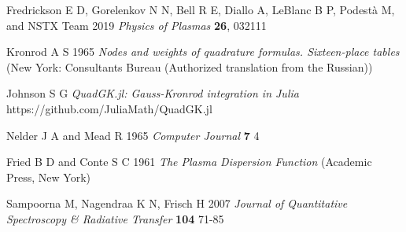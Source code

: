 \documentclass[12pt]{iopart}
\begin{document}
\begin{thebibliography}{9}
Fredrickson E D, Gorelenkov  N N, Bell R E, Diallo A, LeBlanc B P, Podestà  M, and NSTX Team 2019 \textit{Physics of Plasmas} \textbf{26}, 032111

Kronrod A S 1965 \textit{Nodes and weights of quadrature formulas. Sixteen-place tables} (New York: Consultants Bureau (Authorized translation from the Russian))

Johnson S G \textit{QuadGK.jl: Gauss-Kronrod integration in Julia} https://github.com/JuliaMath/QuadGK.jl

Nelder J A and Mead R 1965 \textit{Computer Journal} \textbf{7} 4


Fried B D and Conte S C 1961 \textit{The Plasma Dispersion Function} (Academic Press, New York)

Sampoorna M, Nagendraa K N, Frisch H 2007 \textit{Journal of Quantitative Spectroscopy \& Radiative Transfer} \textbf{104} 71-85


\end{thebibliography}
\end{document}
